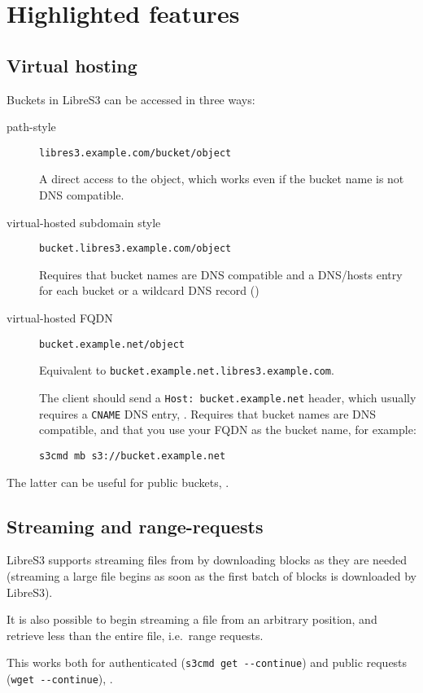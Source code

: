 \chapter{Highlighted features}
\section{Virtual hosting}
\label{sec:virtualhosting}

Buckets in LibreS3 can be accessed in three ways:
\begin{description}
\item [path-style] \verb|libres3.example.com/bucket/object|

 A direct access to the object, which works even if the bucket name is not DNS compatible.
\item [virtual-hosted subdomain style] \verb|bucket.libres3.example.com/object|

 Requires that bucket names are DNS compatible and a DNS/hosts entry for each
  bucket or a wildcard DNS record ()
\item [virtual-hosted FQDN] \verb|bucket.example.net/object|

  Equivalent to \verb|bucket.example.net.libres3.example.com|.

  The client should send a \verb|Host: bucket.example.net| header, which usually requires a
  \verb|CNAME| DNS entry, .
  Requires that bucket names are DNS compatible, and that you use your FQDN as
  the bucket name, for example:

 \verb|s3cmd mb s3://bucket.example.net|
\end{description}

The latter can be useful for public buckets, .

\section{Streaming and range-requests}
\label{sec:streaming}

LibreS3 supports streaming files from \SX by downloading blocks as they are
needed (streaming a large file begins as soon as the first batch of blocks is
downloaded by LibreS3).

It is also possible to begin streaming a file from an arbitrary position, and
retrieve less than the entire file, i.e.\ range requests.

This works both for authenticated  (\verb|s3cmd get --continue|) and public
requests (\verb|wget --continue|), .

